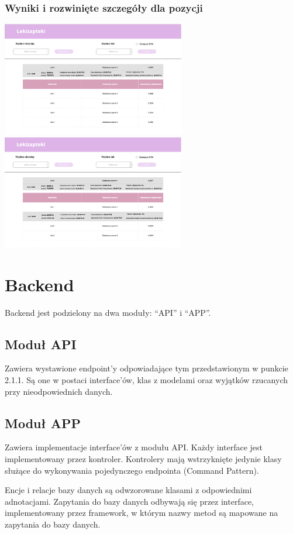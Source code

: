 \documentclass{article}
\begin{document}
  \subsubsection{Wyniki i rozwinięte szczegóły dla pozycji}
  \includegraphics[width=8cm]{images/lekizapteki-leki-identyczne}
  \includegraphics[width=8cm]{images/lekizapteki-leki-identyczne-rozwiniete}

  \section{Backend}
  Backend jest podzielony na dwa moduły: ``API'' i ``APP''.

  \subsection{Moduł API}
  Zawiera wystawione endpoint'y odpowiadające tym przedstawionym w punkcie 2.1.1.
  Są one w postaci interface'ów, klas z modelami oraz wyjątków rzucanych przy nieodpowiednich danych.

  \subsection{Moduł APP}
  Zawiera implementacje interface'ów z modułu API.
  Każdy interface jest implementowany przez kontroler.
  Kontrolery mają wstrzyknięte jedynie klasy służące do wykonywania pojedynczego endpointa (Command Pattern).

  Encje i relacje bazy danych są odwzorowane klasami z odpowiednimi adnotacjami.
  Zapytania do bazy danych odbywają się przez interface, implementowany przez framework,
  w którym nazwy metod są mapowane na zapytania do bazy danych.
\end{document}
